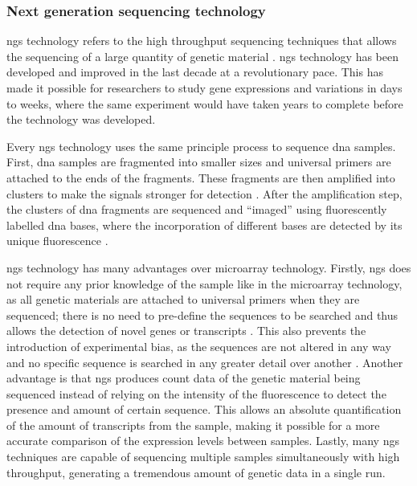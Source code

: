 \subsubsection{Next generation sequencing technology}
\label{ssub:next_generation_sequencing_technology}

\Gls{ngs} technology refers to the high throughput sequencing techniques that allows the sequencing of a large quantity of genetic material \citep{Metzker2010}.
\gls{ngs} technology has been developed and improved in the last decade at a revolutionary pace.
This has made it possible for researchers to study gene expressions and variations in days to weeks, where the same experiment would have taken years to complete before the technology was developed.

Every \gls{ngs} technology uses the same principle process to sequence \acrshort{dna} samples.
First, \acrshort{dna} samples are fragmented into smaller sizes and universal primers are attached to the ends of the fragments.
These fragments are then amplified into clusters to make the signals stronger for detection \citep{Metzker2010}.
After the amplification step, the clusters of \acrshort{dna} fragments are sequenced and ``imaged'' using fluorescently labelled \acrshort{dna} bases, where the incorporation of different bases are detected by its unique fluorescence \citep{Metzker2010}.

\gls{ngs} technology has many advantages over microarray technology.
Firstly, \gls{ngs} does not require any prior knowledge of the sample like in the microarray technology, as all genetic materials are attached to universal primers when they are sequenced; there is no need to pre-define the sequences to be searched and thus allows the detection of novel genes or transcripts \citep{Hurd2009}.
This also prevents the introduction of experimental bias, as the sequences are not altered in any way and no specific sequence is searched in any greater detail over another \citep{Hurd2009}.
Another advantage is that \gls{ngs} produces count data of the genetic material being sequenced instead of relying on the intensity of the fluorescence to detect the presence and amount of certain sequence.
This allows an absolute quantification of the amount of transcripts from the sample, making it possible for a more accurate comparison of the expression levels between samples.
Lastly, many \gls{ngs} techniques are capable of sequencing multiple samples simultaneously with high throughput, generating a tremendous amount of genetic data in a single run.

